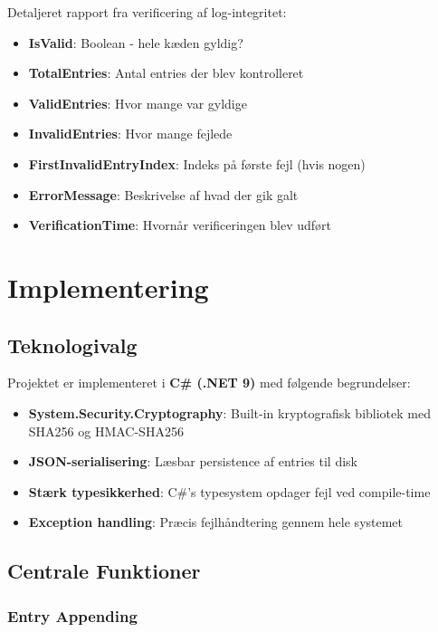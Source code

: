 \documentclass[12pt, a4paper, danish]{article}
\begin{document}
Detaljeret rapport fra verificering af log-integritet:

\begin{itemize}
    \item \textbf{IsValid}: Boolean - hele kæden gyldig?
    \item \textbf{TotalEntries}: Antal entries der blev kontrolleret
    \item \textbf{ValidEntries}: Hvor mange var gyldige
    \item \textbf{InvalidEntries}: Hvor mange fejlede
    \item \textbf{FirstInvalidEntryIndex}: Indeks på første fejl (hvis nogen)
    \item \textbf{ErrorMessage}: Beskrivelse af hvad der gik galt
    \item \textbf{VerificationTime}: Hvornår verificeringen blev udført
\end{itemize}

\newpage
\section{Implementering}

\subsection{Teknologivalg}

Projektet er implementeret i \textbf{C\# (.NET 9)} med følgende begrundelser:

\begin{itemize}
    \item \textbf{System.Security.Cryptography}: Built-in kryptografisk bibliotek med SHA256 og HMAC-SHA256
    \item \textbf{JSON-serialisering}: Læsbar persistence af entries til disk
    \item \textbf{Stærk typesikkerhed}: C\#'s typesystem opdager fejl ved compile-time
    \item \textbf{Exception handling}: Præcis fejlhåndtering gennem hele systemet
\end{itemize}

\subsection{Centrale Funktioner}

\subsubsection{Entry Appending}
\end{document}
